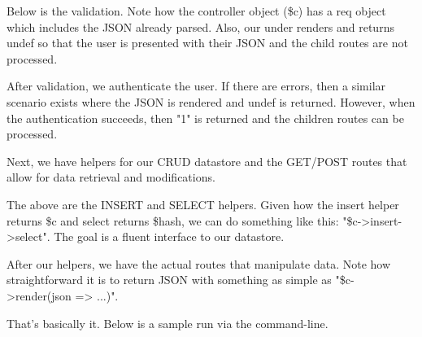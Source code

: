 \documentclass[14pt]{extreport}
\begin{document}
Below is the validation.  Note how the controller object (\$c) has a req object
which includes the JSON already parsed.  Also, our under renders and returns
undef so that the user is presented with their JSON and the child routes are
not processed.



After validation, we authenticate the user.  If there are errors, then a
similar scenario exists where the JSON is rendered and undef is returned.
However, when the authentication succeeds, then "1" is returned and the 
children routes can be processed.



Next, we have helpers for our CRUD datastore and the GET/POST routes that allow
for data retrieval and modifications.



The above are the INSERT and SELECT helpers.  Given how the insert helper returns \$c and
select returns \$hash, we can do something like this: "\$c->insert->select".  The goal
is a fluent interface to our datastore.

After our helpers, we have the actual routes that manipulate data.  Note how straightforward
it is to return JSON with something as simple as "\$c->render(json => ...)".



That's basically it.  Below is a sample run via the command-line.
\end{document}
